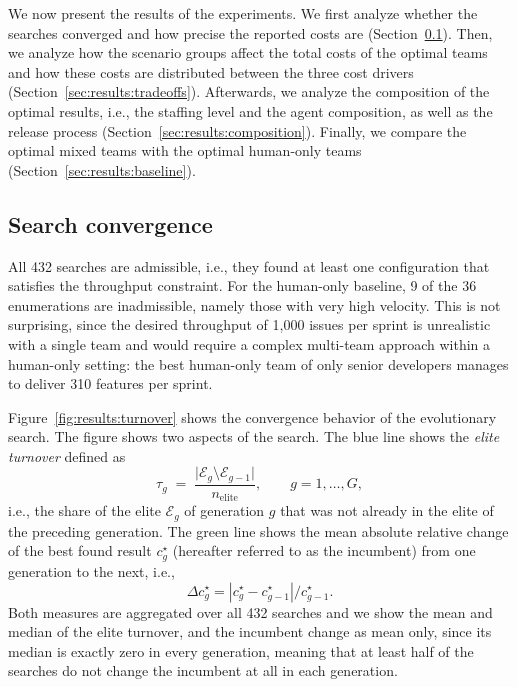 \documentclass[smallextended]{svjour3}       %
\begin{document}
We now present the results of the experiments. We first analyze whether the searches converged and how precise the reported costs are (Section~\ref{sec:results:convergence}). Then, we analyze how the scenario groups affect the total costs of the optimal teams and how these costs are distributed between the three cost drivers (Section~\ref{sec:results:tradeoffs}). Afterwards, we analyze the composition of the optimal results, i.e., the staffing level and the agent composition, as well as the release process (Section~\ref{sec:results:composition}). Finally, we compare the optimal mixed teams with the optimal human-only teams (Section~\ref{sec:results:baseline}).

\subsection{Search convergence}
\label{sec:results:convergence}

All 432 searches are admissible, i.e., they found at least one configuration that satisfies the throughput constraint. For the human-only baseline, 9 of the 36 enumerations are inadmissible, namely those with very high velocity. This is not surprising, since the desired throughput of 1{,}000 issues per sprint is unrealistic with a single team and would require a complex multi-team approach within a human-only setting: the best human-only team of only senior developers manages to deliver 310 features per sprint.

Figure~\ref{fig:results:turnover} shows the convergence behavior of the evolutionary search. The figure shows two aspects of the search. The blue line shows the \emph{elite turnover} defined as
\begin{equation}
  \tau_g \;=\; \frac{\bigl|\mathcal{E}_g \setminus \mathcal{E}_{g-1}\bigr|}{n_\mathrm{elite}},
  \qquad g = 1, \ldots, G,
  \label{eq:elite_turnover}
\end{equation}
i.e., the share of the elite $\mathcal{E}_g$ of generation $g$ that was not already in the elite of the preceding generation. The green line shows the mean absolute relative change of the best found result $c^\star_g$ (hereafter referred to as the incumbent) from one generation to the next, i.e., 
\begin{equation}
  \Delta c^\star_g = |c^\star_g - c^\star_{g-1}| / c^\star_{g-1}.
  \label{eq:incumbent_change}
\end{equation}
Both measures are aggregated over all 432 searches and we show the mean and median of the elite turnover, and the incumbent change as mean only, since its median is exactly zero in every generation, meaning that at least half of the searches do not change the incumbent at all in each generation.
\end{document}
